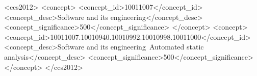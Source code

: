 \documentclass[acmsmall,10pt]{acmart}\settopmatter{printfolios=true}
\begin{document}
\begin{CCSXML}
<ccs2012>
<concept>
<concept_id>10011007</concept_id>
<concept_desc>Software and its engineering</concept_desc>
<concept_significance>500</concept_significance>
</concept>
<concept>
<concept_id>10011007.10010940.10010992.10010998.10011000</concept_id>
<concept_desc>Software and its engineering~Automated static analysis</concept_desc>
<concept_significance>500</concept_significance>
</concept>
</ccs2012>
\end{CCSXML}


%







\begin{abstract}
	
\end{abstract}
\maketitle
\end{document}
